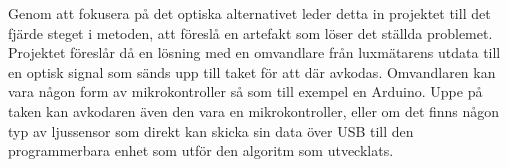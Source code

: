     Genom att fokusera på det optiska alternativet leder detta in projektet till det fjärde steget i metoden, att föreslå en artefakt som löser det ställda problemet. Projektet föreslår då en lösning med en omvandlare från luxmätarens utdata till en optisk signal som sänds upp till taket för att där avkodas. Omvandlaren kan vara någon form av mikrokontroller så som till exempel en Arduino. Uppe på taken kan avkodaren även den vara en mikrokontroller, eller om det finns någon typ av ljussensor som direkt kan skicka sin data över USB till den programmerbara enhet som utför den algoritm som utvecklats.

